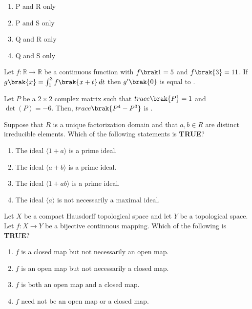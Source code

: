 \begin{multicols}{4}
\begin{enumerate}
    \item P and R only
    \item P and S only
    \item Q and R only
    \item Q and S only
\end{enumerate}
\end{multicols}
\item Let $ f : \mathbb{R} \to \mathbb{R} $ be a continuous function with $ f{\brak1} = 5 $ and $ f\brak{3} = 11 $. If $ g\brak{x} = \int_1^3 f\brak{x + t} \, dt $ then $ g^{\prime}\brak{0} $ is equal to \underline{\hspace{2cm}}.
\\
\item  Let  $P$  be a $ 2 \times 2 $ complex matrix such that $ trace\brak{P} = 1 $ and $ \det(P) = -6 $. Then, $ trace\brak{P^{4} - P^{3}} $ is \underline{\hspace{2cm}}.
\\
\item  Suppose that  $R$  is a unique factorization domain and that $ a, b \in R $ are distinct irreducible elements. Which of the following statements is \textbf{TRUE}?
\begin{enumerate}
    \item The ideal \( \langle 1 + a \rangle \) is a prime ideal.
    \item The ideal \( \langle a + b \rangle \) is a prime ideal.
    \item The ideal \( \langle 1 + ab \rangle \) is a prime ideal.
    \item The ideal \( \langle a \rangle \) is not necessarily a maximal ideal.
\end{enumerate}

\item  Let  $X$  be a compact Hausdorff topological space and let  $Y$  be a topological space. Let $ f : X \to Y $ be a bijective continuous mapping. Which of the following is \textbf{TRUE}?
\begin{enumerate}
    \item $f$ is a closed map but not necessarily an open map.
    \item $f$ is an open map but not necessarily a closed map.
    \item $f$ is both an open map and a closed map.
    \item $f$ need not be an open map or a closed map.
\end{enumerate}

